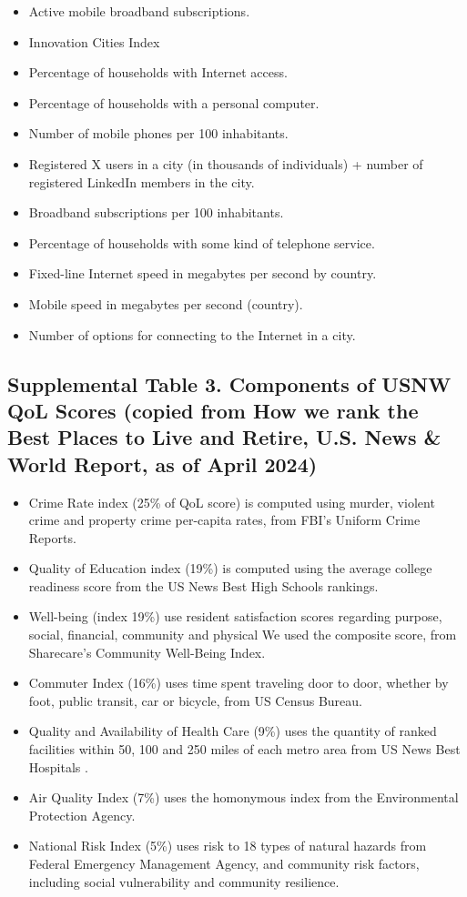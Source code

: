 \documentclass[
  english,
  12pt,
  a4paper,
]{scrartcl}
\providecommand{\tightlist}{%
  \setlength{\itemsep}{0pt}\setlength{\parskip}{0pt}}
\begin{document}
\begin{itemize}
\tightlist
\item
  Active mobile broadband subscriptions.
\item
  Innovation Cities Index
\item
  Percentage of households with Internet access.
\item
  Percentage of households with a personal computer.
\item
  Number of mobile phones per 100 inhabitants.
\item
  Registered X users in a city (in thousands of individuals) + number of
  registered LinkedIn members in the city.
\item
  Broadband subscriptions per 100 inhabitants.
\item
  Percentage of households with some kind of telephone service.
\item
  Fixed-line Internet speed in megabytes per second by country.
\item
  Mobile speed in megabytes per second (country).
\item
  Number of options for connecting to the Internet in a city.
\end{itemize}

\subsection{Supplemental Table 3. Components of USNW QoL Scores (copied
from How we rank the Best Places to Live and Retire, U.S. News \& World
Report, as of April
2024)}\label{supplemental-table-3.-components-of-usnw-qol-scores-copied-from-how-we-rank-the-best-places-to-live-and-retire-u.s.-news-world-report-as-of-april-2024}

\begin{itemize}
\tightlist
\item
  Crime Rate index (25\% of QoL score) is computed using murder, violent
  crime and property crime per-capita rates, from FBI's Uniform Crime
  Reports.
\item
  Quality of Education index (19\%) is computed using the average
  college readiness score from the US News Best High Schools rankings.
\item
  Well-being (index 19\%) use resident satisfaction scores regarding
  purpose, social, financial, community and physical We used the
  composite score, from Sharecare's Community Well-Being Index.
\item
  Commuter Index (16\%) uses time spent traveling door to door, whether
  by foot, public transit, car or bicycle, from US Census Bureau.
\item
  Quality and Availability of Health Care (9\%) uses the quantity of
  ranked facilities within 50, 100 and 250 miles of each metro area from
  US News Best Hospitals .
\item
  Air Quality Index (7\%) uses the homonymous index from the
  Environmental Protection Agency.
\item
  National Risk Index (5\%) uses risk to 18 types of natural hazards
  from Federal Emergency Management Agency, and community risk factors,
  including social vulnerability and community resilience.
\end{itemize}
\end{document}
